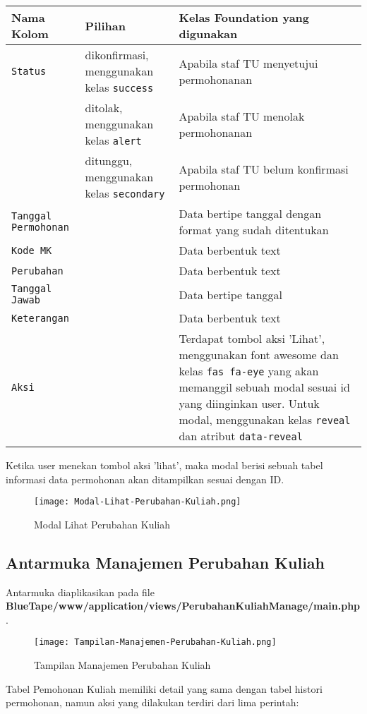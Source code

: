 \begin{tabular}[!htbp]{ |p{4cm}|p{2cm}|p{10cm}|  }
	\hline
	Nama Kolom & Pilihan & Kelas Foundation yang digunakan\\
	\hline
	\texttt{Status} & dikonfirmasi, menggunakan kelas \colorbox{mygray}{\verb|success|} & Apabila staf TU menyetujui permohonanan\\
	\hline
	&  ditolak, menggunakan kelas \colorbox{mygray}{\verb|alert|}  & Apabila staf TU menolak permohonanan\\
	\hline
	& ditunggu, menggunakan kelas \colorbox{mygray}{\verb|secondary|} &  Apabila staf TU belum konfirmasi permohonan \\
	\hline
	\texttt{Tanggal Permohonan}    & & Data bertipe tanggal dengan format yang sudah ditentukan\\
	\hline
	\texttt{Kode MK} &  & Data berbentuk text \\
	\hline
	\texttt{Perubahan} &  & Data berbentuk text \\
	\hline
	\texttt{Tanggal Jawab} &  & Data bertipe tanggal \\
	\hline
	\texttt{Keterangan} &  & Data berbentuk text \\
	\hline
	\texttt{Aksi} &  & Terdapat tombol aksi 'Lihat', menggunakan font awesome dan kelas \colorbox{mygray}{\verb|fas fa-eye|} yang akan memanggil sebuah modal sesuai id yang diinginkan user. Untuk modal, menggunakan kelas \texttt{reveal} dan atribut \colorbox{mygray}{\texttt{data-reveal}}\\
	\hline
\end{tabular}
Ketika user menekan tombol aksi 'lihat', maka modal berisi sebuah tabel informasi data permohonan akan ditampilkan sesuai dengan ID.
\begin{figure} [H]
	\centering  
	\texttt{[image: Modal-Lihat-Perubahan-Kuliah.png]}  
	\caption{Modal Lihat Perubahan Kuliah} 
\end{figure}

\subsection{Antarmuka Manajemen Perubahan Kuliah}
Antarmuka diaplikasikan pada file \textbf{BlueTape/www/application/views/PerubahanKuliahManage/main.php}.
\begin{figure} [H]
	\centering  
	\texttt{[image: Tampilan-Manajemen-Perubahan-Kuliah.png]}  
	\caption{Tampilan Manajemen Perubahan Kuliah} 
\end{figure}
Tabel Pemohonan Kuliah memiliki detail yang sama dengan tabel histori permohonan, namun aksi yang dilakukan terdiri dari lima perintah:

